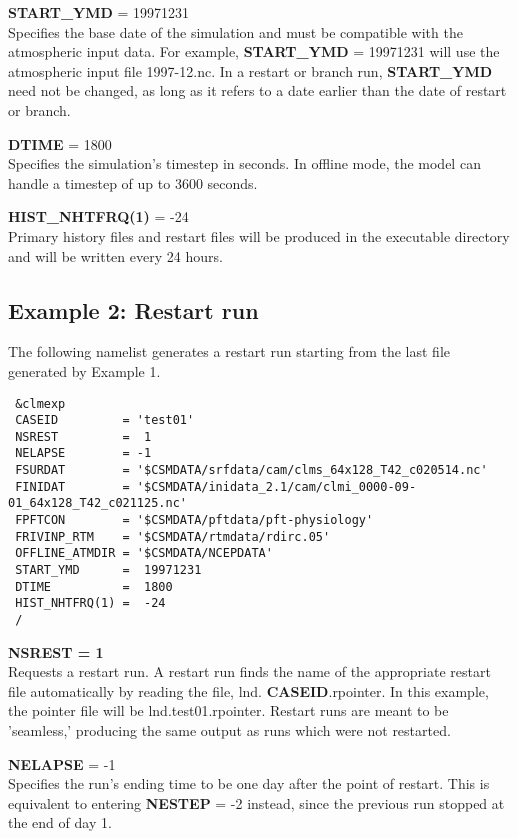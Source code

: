 \medskip \noindent 
{\bf START\_YMD} = 19971231 \\ 
Specifies the base date of the simulation and must be compatible with
the atmospheric input data. For example, {\bf START\_YMD} = 19971231
will use the atmospheric input file 1997-12.nc. In a restart or branch
run, {\bf START\_YMD} need not be changed, as long as it refers to a
date earlier than the date of restart or branch.

\medskip \noindent 
{\bf DTIME} = 1800 \\
Specifies the simulation's timestep in seconds. In offline mode, the
model can handle a timestep of up to 3600 seconds.

\medskip \noindent 
{\bf HIST\_NHTFRQ(1)} = -24 \\
Primary history files and restart files will be produced in the
executable directory and will be written every 24 hours.

\subsection {Example 2: Restart run}

\noindent 
The following namelist generates a restart run starting from the last
file generated by Example 1.

\begin{verbatim}
 &clmexp
 CASEID         = 'test01' 
 NSREST         =  1 
 NELAPSE        = -1 
 FSURDAT        = '$CSMDATA/srfdata/cam/clms_64x128_T42_c020514.nc'
 FINIDAT        = '$CSMDATA/inidata_2.1/cam/clmi_0000-09-01_64x128_T42_c021125.nc'
 FPFTCON        = '$CSMDATA/pftdata/pft-physiology' 
 FRIVINP_RTM    = '$CSMDATA/rtmdata/rdirc.05'
 OFFLINE_ATMDIR = '$CSMDATA/NCEPDATA' 
 START_YMD      =  19971231 
 DTIME          =  1800 
 HIST_NHTFRQ(1) =  -24
 / 
\end{verbatim}

\medskip \noindent 
{\bf NSREST = 1} \\
Requests a restart run. A restart run finds the name of the
appropriate restart file automatically by reading the file, lnd.{\bf
CASEID}.rpointer.  In this example, the pointer file will be
lnd.test01.rpointer. Restart runs are meant to be 'seamless,'
producing the same output as runs which were not restarted.

\medskip \noindent 
{\bf NELAPSE} = -1 \\
Specifies the run's ending time to be one day after the point of
restart. This is equivalent to entering {\bf NESTEP} = -2 instead,
since the previous run stopped at the end of day 1.

